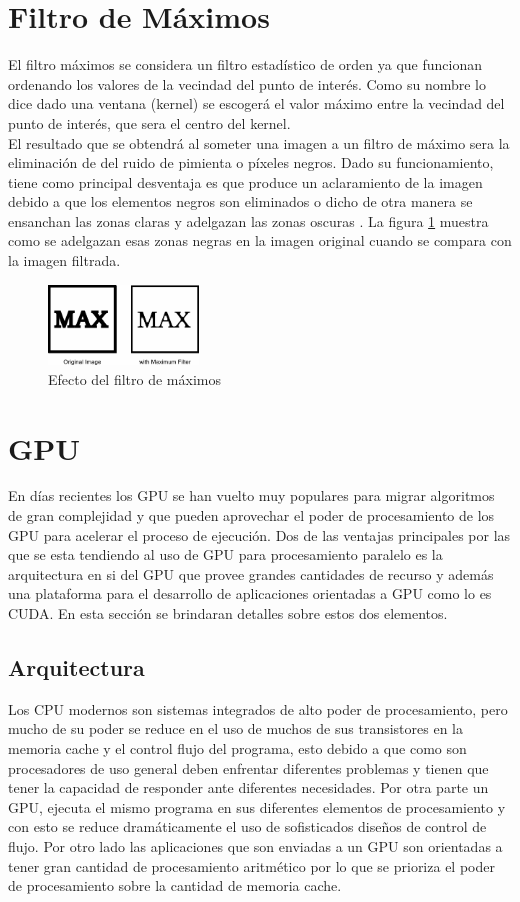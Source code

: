 \documentclass[conference]{IEEEtran}
\begin{document}
\section{\textbf{Filtro de Máximos}}
El filtro máximos se considera un filtro estadístico de orden ya que funcionan ordenando los valores de la vecindad del punto de interés. Como su nombre lo dice dado una ventana (kernel) se escogerá el valor máximo entre la vecindad del punto de interés, que sera el centro del kernel.\\
El resultado que se obtendrá al someter una imagen a un filtro de máximo sera la eliminación de del ruido de pimienta o píxeles negros. Dado su funcionamiento, tiene como principal desventaja es que produce un aclaramiento de la imagen debido a que los elementos negros son eliminados o dicho de otra manera se ensanchan las zonas claras y adelgazan las zonas oscuras \cite{max}. La figura \ref{maxF} muestra como se adelgazan esas zonas negras en la imagen original cuando se compara con la imagen filtrada.

\begin{figure}[H]
\centering
\includegraphics[width=4cm]{maxF}
\caption{Efecto del filtro de máximos}
\label{maxF}
\end{figure}

\section{\textbf{GPU}}
En días recientes los GPU se han vuelto muy populares para migrar algoritmos de gran complejidad y que pueden aprovechar el poder de procesamiento de los GPU para acelerar el proceso de ejecución. Dos de las ventajas principales por las que se esta tendiendo al uso de GPU para procesamiento paralelo es la arquitectura en si del GPU que provee grandes cantidades de recurso y además una plataforma para el desarrollo de aplicaciones orientadas a GPU como lo es CUDA. En esta sección se brindaran detalles sobre estos dos elementos.
\subsection{\textbf{Arquitectura}}
Los CPU modernos son sistemas integrados de alto poder de procesamiento, pero mucho de su poder se reduce en el uso de muchos de sus transistores en la memoria cache y el control flujo del programa, esto debido a que como son procesadores de uso general deben enfrentar diferentes problemas y tienen que tener la capacidad de responder ante diferentes necesidades. Por otra parte un GPU, ejecuta el mismo programa en sus diferentes elementos de procesamiento y con esto se reduce dramáticamente el uso de sofisticados diseños de control de flujo. Por otro lado las aplicaciones que son enviadas a un GPU son orientadas a tener gran cantidad de procesamiento aritmético por lo que se prioriza el poder de procesamiento sobre la cantidad de memoria cache\cite{info_cuda}.\\
\end{document}
